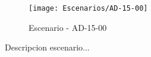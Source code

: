 \begin{figure}[H]
\centering
\texttt{[image: Escenarios/AD-15-00]}
\caption{Escenario - AD-15-00}
\label{fig:AD-15-00}
\end{figure}

Descripcion escenario...
\clearpage
